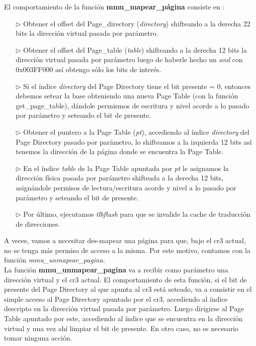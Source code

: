 \documentclass[a4paper]{article}
\begin{document}
El comportamiento de la funci\'on \textbf{mmu_mapear_p\'agina} consiste en :

\begin{itemize}
\item[$\triangleright$] Obtener el offset del Page_directory (\textit{directory}) shifteando a la derecha 22 bits la direcci\'on virtual pasada por par\'ametro.
\item[$\triangleright$] Obtener el offset del Page_table (\textit{table}) shifteando a la derecha 12 bits la direcci\'on virtual pasada por par\'ametro luego de haberle hecho un \emph{and} con 0x003FF000 as\'i obtengo s\'olo los bits de inter\'es.
\item[$\triangleright$] Si el \'indice \textit{directory} del Page Directory tiene el bit presente = 0, entonces debemos setear la base obteniendo una nueva Page Table (con la funci\'on get_page_table), d\'andole permismos de escritura y nivel acorde a lo pasado por par\'ametro y seteando el bit de presente.
\item[$\triangleright$] Obtener el puntero a la Page Table (\textit{pt}), accediendo al \'indice \textit{directory} del Page Directory pasado por par\'ametro, lo shifteamos a la izquierda 12 bits as\'i tenemos la direcci\'on de la p\'agina donde se encuentra la Page Table.
\item[$\triangleright$] En el \'indice \textit{table} de la Page Table apuntada por \textit{pt} le asignamos la direcci\'on f\'isica pasada por par\'ametro shifteada a la derecha 12 bits, asign\'andole permisos de lectura/escritura acorde y nivel a lo pasado por par\'ametro y seteando el bit de presente.
\item[$\triangleright$] Por \'ultimo, ejecutamos \emph{tlbflush} para que se invalide la cache de traducci\'on de direcciones.
\end{itemize}

\bigskip

A veces, vamos a necesitar des-mapear una p\'agina para que, bajo el cr3 actual, no se tenga m\'as permiso de acceso a la misma. Por este motivo, contamos con la funci\'on \textit{mmu_unmapear_pagina}.\\


La funci\'on \textbf{mmu_unmapear_pagina} va a recibir como par\'ametro una direcci\'on virtual y el cr3 actual. El comportamiento de esta funci\'on, si el bit de presente del Page Directory al que apunta al cr3 est\'a seteado, va a consistir en el simple acceso al Page Directory apuntado por el cr3, accediendo al \'indice descripto en la direcci\'on virtual pasada por par\'ametro. Luego dirigirse al Page Table apuntado por este, accediendo al \'indice que se encuentra en la direcci\'on virtual y una vez ah\'i limpiar el bit de presente. En otro caso, no es necesario tomar ninguna acci\'on.
\end{document}
